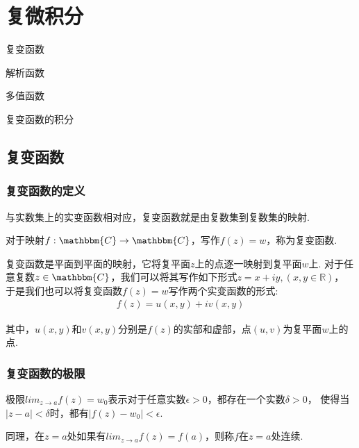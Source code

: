 \chapter{复微积分}
\begin{introduction}
    \item 复变函数
    \item 解析函数
    \item 多值函数
    \item 复变函数的积分
\end{introduction}
\section{复变函数}
    \subsection{复变函数的定义}
        与实数集上的实变函数相对应，复变函数就是由复数集到复数集的映射.\par
        \begin{definition}[复变函数]\label{def:complex_function}
            对于映射$f: \mathbbm{C} \to \mathbbm{C}$，写作$f(z)=w$，称为复变函数.
        \end{definition}

        复变函数是平面到平面的映射，它将复平面$z$上的点逐一映射到复平面$w$上.
        对于任意复数$z \in \mathbbm{C}$，我们可以将其写作如下形式$z = x + iy,(x,y \in \mathbb{R})$，
        于是我们也可以将复变函数$f(z) = w$写作两个实变函数的形式:
        \begin{align}
            f(z) = u(x,y) + iv(x,y)
        \end{align}

        其中，$u(x,y)$和$v(x,y)$分别是$f(z)$的实部和虚部，点$(u, v)$为复平面$w$上的点.

    \subsection{复变函数的极限}
        \begin{definition}[复变函数的极限]\label{def:limits_of_complex_function}
            极限$lim_{z \to a}f(z) = w_0$表示对于任意实数$\epsilon > 0$，都存在一个实数$\delta > 0$，
            使得当$|z - a| < \delta$时，都有$|f(z) - w_0| < \epsilon$.
        \end{definition}

        \begin{definition}[复变函数的连续性]\label{def:continuity_of_complex_function}
                    同理，在$z = a$处如果有$lim_{z \to a}f(z) = f(a)$，则称$f$在$z = a$处连续.
                \end{definition}


